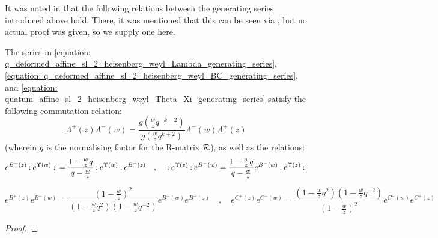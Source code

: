         It was noted in \cite{frenkel_reshetikhin_affine_QUEs_and_deformed_virasoro_and_finite_W_algebras} that the following relations between the generating series introduced above hold. There, it was mentioned that this can be seen via \cite{awata_odake_shiraishi_free_boson_realisation_of_quantum_affine_sl_N}, but no actual proof was given, so we supply one here.
        \begin{lemma} \label{lemma: q_deformed_affine_sl_2_heisenberg_weyl_generating_series_commutation_relations}
            The series in \eqref{equation: q_deformed_affine_sl_2_heisenberg_weyl_Lambda_generating_series}, \eqref{equation: q_deformed_affine_sl_2_heisenberg_weyl_BC_generating_series}, and \eqref{equation: quatum_affine_sl_2_heisenberg_weyl_Theta_Xi_generating_series} satisfy the following commutation relation:
                \begin{equation} \label{equation: q_deformed_affine_sl_2_heisenberg_weyl_Lambda_generating_series_commutators}
                    \Lambda^+(z) \Lambda^-(w) = \frac{ g\left( \frac{w}{z} q^{-k - 2} \right) }{ g\left( \frac{w}{z} q^{k + 2} \right) } \Lambda^-(w) \Lambda^+(z)
                \end{equation}
            (wherein $g$ is the normalising factor for the R-matrix $\mathcal{R}$), as well as the relations:
                \begin{equation} \label{equation: q_deformed_affine_sl_2_heisenberg_weyl_BC_generating_series_commutators}
                    e^{ B^+(z) } \: \mathbf{:} \: { e^{\Upsilon(w)} }  \: \mathbf{:} \: = \frac{ 1 - \frac{w}{z} q }{ q - \frac{w}{z} } \: \mathbf{:} \: { e^{\Upsilon(w)} }  \: \mathbf{:} \: e^{ B^+(z) }
                    \quad, \quad
                    \: \mathbf{:} \: { e^{ \Upsilon(z) } }  \: \mathbf{:} \: e^{ B^-(w) } = \frac{ 1 - \frac{w}{z} q }{ q - \frac{w}{z} } e^{B^-(w)} \: \mathbf{:} \: { e^{ \Upsilon(z) } }  \: \mathbf{:} \:
                \end{equation}
                
                \begin{equation} \label{equation: quatum_affine_sl_2_heisenberg_weyl_Theta_Xi_generating_series_commutators}
                    e^{B^+(z)} e^{B^-(w)} = \frac{ \left(1 - \frac{w}{z}\right)^2 }{ \left( 1 - \frac{w}{z} q^2 \right) \left( 1 - \frac{w}{z} q^{-2} \right) } e^{B^-(w)} e^{B^+(z)}
                    \quad, \quad
                    e^{C^+(z)} e^{C^-(w)} = \frac{ \left( 1 - \frac{w}{z} q^2 \right) \left( 1 - \frac{w}{z} q^{-2} \right) }{ \left(1 - \frac{w}{z}\right)^2 } e^{C^-(w)} e^{C^+(z)}
                \end{equation}
        \end{lemma}
            \begin{proof}
                
            \end{proof}

